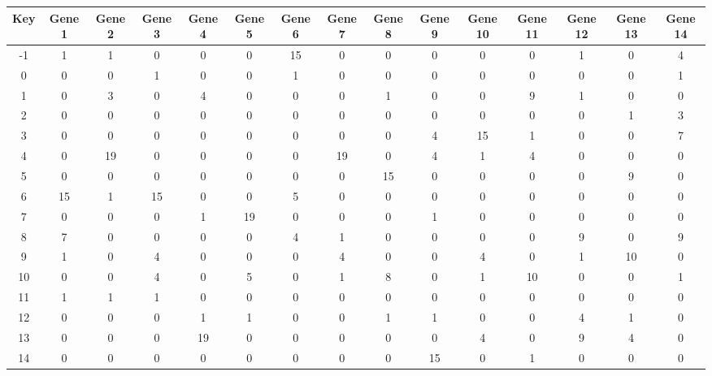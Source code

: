 \begin{tabular}{|c|c|c|c|c|c|c|c|c|c|c|c|c|c|c|}
\hline
Key & Gene 1 & Gene 2 & Gene 3 & Gene 4 & Gene 5 & Gene 6 & Gene 7 & Gene 8 & Gene 9 & Gene 10 & Gene 11 & Gene 12 & Gene 13 & Gene 14 \\
\hline
-1 & 1 & 1 & 0 & 0 & 0 & 15 & 0 & 0 & 0 & 0 & 0 & 1 & 0 & 4 \\
0 & 0 & 0 & 1 & 0 & 0 & 1 & 0 & 0 & 0 & 0 & 0 & 0 & 0 & 1 \\
1 & 0 & 3 & 0 & 4 & 0 & 0 & 0 & 1 & 0 & 0 & 9 & 1 & 0 & 0 \\
2 & 0 & 0 & 0 & 0 & 0 & 0 & 0 & 0 & 0 & 0 & 0 & 0 & 1 & 3 \\
3 & 0 & 0 & 0 & 0 & 0 & 0 & 0 & 0 & 4 & 15 & 1 & 0 & 0 & 7 \\
4 & 0 & 19 & 0 & 0 & 0 & 0 & 19 & 0 & 4 & 1 & 4 & 0 & 0 & 0 \\
5 & 0 & 0 & 0 & 0 & 0 & 0 & 0 & 15 & 0 & 0 & 0 & 0 & 9 & 0 \\
6 & 15 & 1 & 15 & 0 & 0 & 5 & 0 & 0 & 0 & 0 & 0 & 0 & 0 & 0 \\
7 & 0 & 0 & 0 & 1 & 19 & 0 & 0 & 0 & 1 & 0 & 0 & 0 & 0 & 0 \\
8 & 7 & 0 & 0 & 0 & 0 & 4 & 1 & 0 & 0 & 0 & 0 & 9 & 0 & 9 \\
9 & 1 & 0 & 4 & 0 & 0 & 0 & 4 & 0 & 0 & 4 & 0 & 1 & 10 & 0 \\
10 & 0 & 0 & 4 & 0 & 5 & 0 & 1 & 8 & 0 & 1 & 10 & 0 & 0 & 1 \\
11 & 1 & 1 & 1 & 0 & 0 & 0 & 0 & 0 & 0 & 0 & 0 & 0 & 0 & 0 \\
12 & 0 & 0 & 0 & 1 & 1 & 0 & 0 & 1 & 1 & 0 & 0 & 4 & 1 & 0 \\
13 & 0 & 0 & 0 & 19 & 0 & 0 & 0 & 0 & 0 & 4 & 0 & 9 & 4 & 0 \\
14 & 0 & 0 & 0 & 0 & 0 & 0 & 0 & 0 & 15 & 0 & 1 & 0 & 0 & 0 \\
\hline
\end{tabular}